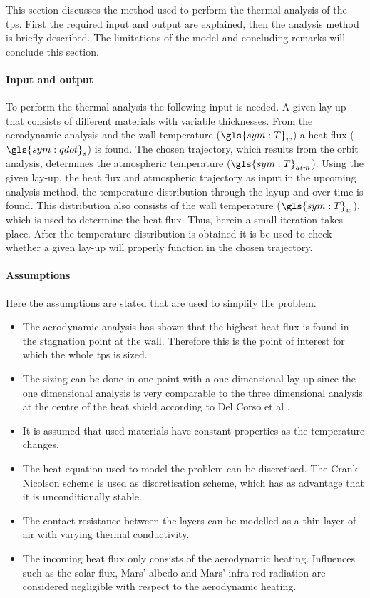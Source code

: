 This section discusses the method used to perform the thermal analysis of the \gls{tps}. First the required input and output are explained, then the analysis method is briefly described. The limitations of the model and concluding remarks will conclude this section.

\paragraph{Input and output}
To perform the thermal analysis the following input is needed. A given lay-up that consists of different materials with variable thicknesses. From the aerodynamic analysis and the wall temperature ($\gls{sym:T}_w$) a heat flux ($\gls{sym:qdot}_s$) is found. The chosen trajectory, which results from the orbit analysis, determines the atmospheric temperature ($\gls{sym:T}_{atm}$). Using the given lay-up, the heat flux and atmospheric trajectory as input in the upcoming analysis method, the temperature distribution through the layup and over time is found. This distribution also consists of the wall temperature ($\gls{sym:T}_w$), which is used to determine the heat flux. Thus, herein a small iteration takes place. After the temperature distribution is obtained it is be used to check whether a given lay-up will properly function in the chosen trajectory.

\paragraph{Assumptions}
Here the assumptions are stated that are used to simplify the problem.
\begin{itemize}
	\item The aerodynamic analysis has shown that the highest heat flux is found in the stagnation point at the wall. Therefore this is the point of interest for which the whole \gls{tps} is sized.
	\item The sizing can be done in one point with a one dimensional lay-up since the one dimensional analysis is very comparable to the three dimensional analysis at the centre of the heat shield according to Del Corso et al \cite{Corso2009}.
	\item It is assumed that used materials have constant properties as the temperature changes. 
	\item The heat equation used to model the problem can be discretised. The Crank-Nicolson scheme is used as discretisation scheme, which has as advantage that it is unconditionally stable.
	\item The contact resistance between the layers can be modelled as a thin layer of air with varying thermal conductivity.
	\item The incoming heat flux only consists of the aerodynamic heating. Influences such as the solar flux, Mars' albedo and Mars' infra-red radiation are considered negligible with respect to the aerodynamic heating.
\end{itemize}



